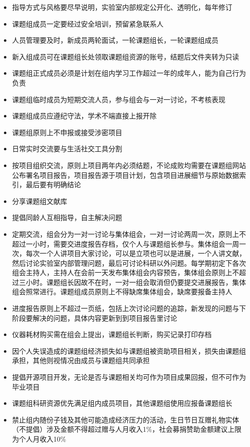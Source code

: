\documentclass[]{tufte-book}
\providecommand{\tightlist}{%
  \setlength{\itemsep}{0pt}\setlength{\parskip}{0pt}}
\begin{document}
\begin{itemize}
\tightlist
\item
  指导方式与风格要尽早说明，实验室内部规定公开化、透明化，每年修订
\item
  课题组成员一定要经过安全培训，预留紧急联系人
\item
  人员管理要及时，新成员两轮面试，一轮课题组长，一轮课题组成员
\item
  新入组成员可在课题组长处领取课题组资源的账号，结题后文件夹转为只读
\item
  课题组正式成员必须是计划在组内学习工作超过一年的成年人，能为自己行为负责
\item
  课题组临时成员为短期交流人员，参与组会与一对一讨论，不考核表现
\item
  课题组成员应遵纪守法，学术不端直接上报开除
\item
  课题组原则上不申报或接受涉密项目
\item
  日常实时交流要与生活社交工具分割
\item
  按项目组织交流，原则上项目两年内必须结题，不论成败均需要在课题组网站公布署名项目报告，项目报告源于项目计划，包含项目进展细节与原始数据索引，最后要有明确结论
\item
  分享课题组文献库
\item
  提倡同龄人互相指导，自主解决问题
\item
  定期交流，组会分为一对一讨论与集体组会，一对一讨论两周一次，原则上不超过一小时，需要交进度报告存档，仅个人与课题组长参与。集体组会一周一次，每次一个人讲项目大家讨论，可以是立项也可以是进展，一个人讲文献，然后讨论实验室内部管理问题，最后可讨论科研以外问题。每学期初定下各次组会主持人，主持人在会前一天发布集体组会内容预告，集体组会原则上不超过三小时。课题组长因故不在时，一对一组会取消但仍要提交进展报告，集体组会照常进行。课题组成员原则上不得缺席集体组会，缺席要报备主持人
\item
  进度报告原则上不超过一页纸，包括上次讨论问题的追踪，新发现的问题与下阶段要解决的问题，具体内容更新到到项目报告里讨论
\item
  仪器耗材购买需在组会上提出，课题组长判断，购买记录打印存档
\item
  因个人失误造成的课题组经济损失如与课题组被资助项目相关，损失由课题组承担，其他则视情况由成员与课题组共同承担
\item
  提倡开源项目开发，无论是否与课题相关均可作为项目成果回报，但不可作为毕业项目
\item
  课题组科研资源优先满足组内成员项目，其他课题组使用应报备课题组长
\item
  禁止组内随份子钱及其他可能造成经济压力的活动，生日节日互赠礼物实体（不提倡）涉及金额不得超过赠与人月收入1\%，社会募捐赞助金额建议上限为个人月收入10\%

\end{itemize}
\end{document}

